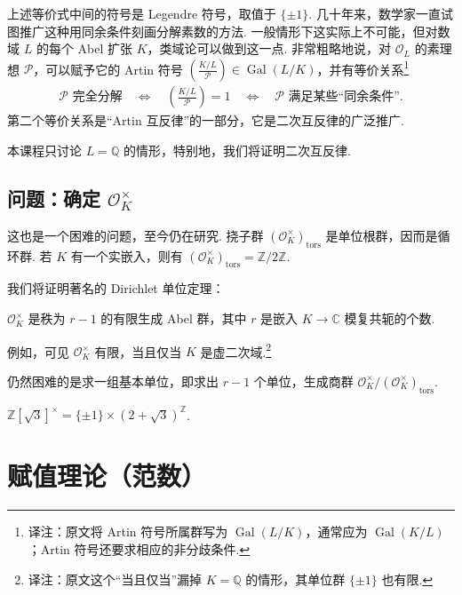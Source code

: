 上述等价式中间的符号是 Legendre 符号，取值于 $\{\pm1\}$. 几十年来，数学家一直试图推广这种用同余条件刻画分解素数的方法. 一般情形下这实际上不可能，但对数域 $L$ 的每个 Abel 扩张 $K$，类域论可以做到这一点. 非常粗略地说，对 $\mathcal O_L$ 的素理想 $\mathcal P$，可以赋予它的 Artin 符号 $\left(\frac{K/L}{\mathcal P}\right)\in\operatorname{Gal}(L/K)$，并有等价关系\footnote{译注：原文将 Artin 符号所属群写为 $\operatorname{Gal}(L/K)$，通常应为 $\operatorname{Gal}(K/L)$；Artin 符号还要求相应的非分歧条件.}
\begin{align*}
\mathcal P\text{ 完全分解}\quad\Longleftrightarrow\quad\left(\frac{K/L}{\mathcal P}\right)=1\quad\Longleftrightarrow\quad\mathcal P\text{ 满足某些``同余条件''}.
\end{align*}
第二个等价关系是``Artin 互反律''的一部分，它是二次互反律的广泛推广.

本课程只讨论 $L=\mathbb{Q}$ 的情形，特别地，我们将证明二次互反律.

\subsection{问题：确定 $\mathcal O_K^\times$}\label{sec:nt-1-2-5}

这也是一个困难的问题，至今仍在研究. 挠子群 $(\mathcal O_K^\times)_{\mathrm{tors}}$ 是单位根群，因而是循环群. 若 $K$ 有一个实嵌入，则有 $(\mathcal O_K^\times)_{\mathrm{tors}}=\mathbb{Z}/2\mathbb{Z}$.

我们将证明著名的 Dirichlet 单位定理：

\begin{theorem*}

$\mathcal O_K^\times$ 是秩为 $r-1$ 的有限生成 Abel 群，其中 $r$ 是嵌入 $K\longrightarrow\mathbb{C}$ 模复共轭的个数.

\end{theorem*}

例如，可见 $\mathcal O_K^\times$ 有限，当且仅当 $K$ 是虚二次域.\footnote{译注：原文这个``当且仅当''漏掉 $K=\mathbb{Q}$ 的情形，其单位群 $\{\pm1\}$ 也有限.}

仍然困难的是求一组基本单位，即求出 $r-1$ 个单位，生成商群 $\mathcal O_K^\times/(\mathcal O_K^\times)_{\mathrm{tors}}$.

\begin{example*}

$\mathbb{Z}[\sqrt3]^\times=\{\pm1\}\times(2+\sqrt3)^{\mathbb{Z}}$.

\end{example*}

\section{赋值理论（范数）}\label{sec:nt-1-3}

